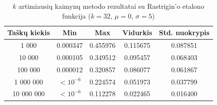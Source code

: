 \begin{table}[H]
    \centering
    \begin{tabular}{|c|c|c|c|c|}
        \hline
        \textbf{Taškų kiekis} & \textbf{Min} & \textbf{Max} & \textbf{Vidurkis} & \textbf{Std. nuokrypis} \\ \hline
        1 000        & 0.000347 & 0.455976 & 0.115675 & 0.087851 \\ \hline
        10 000       & 0.000105 & 0.349512 & 0.095457 & 0.068403 \\ \hline
        100 000      & 0.000012 & 0.320857 & 0.086077 & 0.061867 \\ \hline
        1 000 000    & $<10^{-6}$ & 0.224574 & 0.051973 & 0.037799 \\ \hline
        10 000 000   & $<10^{-6}$ & 0.112278 & 0.022465 & 0.016400 \\ \hline
    \end{tabular}
    \caption{$k$ artimiausių kaimynų metodo rezultatai su Rastrigin'o etalono funkcija ($k = 32$, $\mu = 0$, $\sigma = 5$)}
\end{table}
